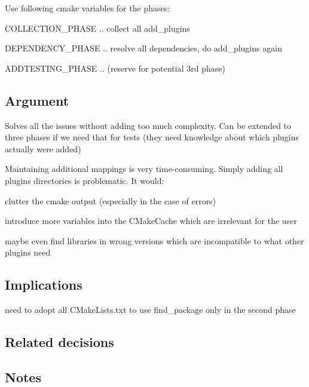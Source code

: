Use following cmake variables for the phases\+:


\begin{DoxyItemize}
\item {\ttfamily C\+O\+L\+L\+E\+C\+T\+I\+O\+N\+\_\+\+P\+H\+A\+S\+E} .. collect all {\ttfamily add\+\_\+plugins}
\item {\ttfamily D\+E\+P\+E\+N\+D\+E\+N\+C\+Y\+\_\+\+P\+H\+A\+S\+E} .. resolve all dependencies, do {\ttfamily add\+\_\+plugins} again
\item {\ttfamily A\+D\+D\+T\+E\+S\+T\+I\+N\+G\+\_\+\+P\+H\+A\+S\+E} .. (reserve for potential 3rd phase)
\end{DoxyItemize}

\subsection*{Argument}

Solves all the issues without adding too much complexity. Can be extended to three phases if we need that for tests (they need knowledge about which plugins actually were added)

Maintaining additional mappings is very time-\/consuming. Simply adding all plugins directories is problematic. It would\+:


\begin{DoxyItemize}
\item clutter the cmake output (especially in the case of errors)
\item introduce more variables into the C\+Make\+Cache which are irrelevant for the user
\item maybe even find libraries in wrong versions which are incompatible to what other plugins need
\end{DoxyItemize}

\subsection*{Implications}


\begin{DoxyItemize}
\item need to adopt all C\+Make\+Lists.\+txt to use {\ttfamily find\+\_\+package} only in the second phase
\end{DoxyItemize}

\subsection*{Related decisions}

\subsection*{Notes}